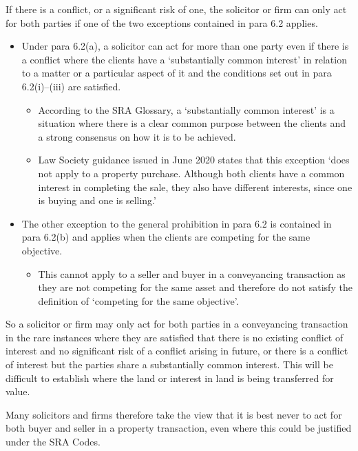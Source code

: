 \documentclass[
]{article}
\newenvironment{Shaded}{}{}
\newcommand{\NormalTok}[1]{#1}
\providecommand{\tightlist}{%
  \setlength{\itemsep}{0pt}\setlength{\parskip}{0pt}}
\begin{document}
If there is a conflict, or a significant risk of one, the solicitor or
firm can only act for both parties if one of the two exceptions
contained in para 6.2 applies.

\begin{itemize}
\tightlist
\item
  Under para 6.2(a), a solicitor can act for more than one party even if
  there is a conflict where the clients have a `substantially common
  interest' in relation to a matter or a particular aspect of it and the
  conditions set out in para 6.2(i)--(iii) are satisfied.

  \begin{itemize}
  \tightlist
  \item
    According to the SRA Glossary, a `substantially common interest' is
    a situation where there is a clear common purpose between the
    clients and a strong consensus on how it is to be achieved.
  \item
    Law Society guidance issued in June 2020 states that this exception
    `does not apply to a property purchase. Although both clients have a
    common interest in completing the sale, they also have different
    interests, since one is buying and one is selling.'
  \end{itemize}
\item
  The other exception to the general prohibition in para 6.2 is
  contained in para 6.2(b) and applies when the clients are competing
  for the same objective.

  \begin{itemize}
  \tightlist
  \item
    This cannot apply to a seller and buyer in a conveyancing
    transaction as they are not competing for the same asset and
    therefore do not satisfy the definition of `competing for the same
    objective'.
  \end{itemize}
\end{itemize}

\begin{Shaded}
\begin{Highlighting}[]
\NormalTok{So a solicitor or firm may only act for both parties in a conveyancing transaction in the rare instances where they are satisfied that there is no existing conflict of interest and no significant risk of a conflict arising in future, or there is a conflict of interest but the parties share a substantially common interest. This will be difficult to establish where the land or interest in land is being transferred for value.}

\NormalTok{Many solicitors and firms therefore take the view that it is best never to act for both buyer and seller in a property transaction, even where this could be justified under the SRA Codes.}
\end{Highlighting}
\end{Shaded}
\end{document}
